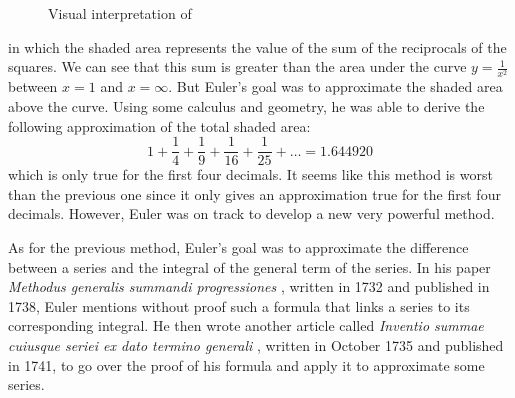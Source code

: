 \begin{figure}[h]
    \centering
    \caption{Visual interpretation of}
    \label{fig:visual sum vs integral}
\end{figure}

in which the shaded area represents the value of the sum of the reciprocals of the squares. We can see that this sum is greater than the area under the curve $y = \frac{1}{x^2}$ between $x=1$ and $x = \infty$. But Euler's goal was to approximate the shaded area above the curve. Using some calculus and geometry, he was able to derive the following approximation of the total shaded area:
$$1 + \frac{1}{4} + \frac{1}{9} + \frac{1}{16} + \frac{1}{25} + \dots = 1.644920$$
which is only true for the first four decimals. It seems like this method is worst than the previous one since it only gives an approximation true for the first four decimals. However, Euler was on track to develop a new very powerful method.

As for the previous method, Euler's goal was to approximate the difference between a series and the integral of the general term of the series. In his paper \textit{Methodus generalis summandi progressiones} \cite{eulerE25}, written in 1732 and published in 1738, Euler mentions without proof such a formula that links a series to its corresponding integral. He then wrote another article called \textit{Inventio summae cuiusque seriei ex dato termino generali} \cite{eulerE47}, written in October 1735 and published in 1741, to go over the proof of his formula and apply it to approximate some series. 

